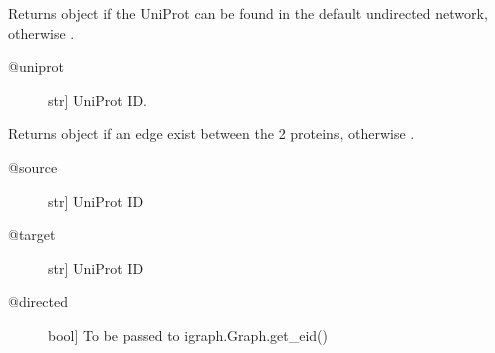 \documentclass[letterpaper,10pt,english]{sphinxmanual}
\begin{document}
\begin{fulllineitems}

\begin{fulllineitems}
\label{\detokenize{main:pypath.main.PyPath.up}}
Returns  object if the UniProt
can be found in the default undirected network,
otherwise .
\begin{description}
\item[{@uniprot}] \leavevmode{[}str{]}
UniProt ID.

\end{description}

\end{fulllineitems}


\begin{fulllineitems}
\label{\detokenize{main:pypath.main.PyPath.up_affected_by}}
\end{fulllineitems}


\begin{fulllineitems}
\label{\detokenize{main:pypath.main.PyPath.up_affects}}
\end{fulllineitems}


\begin{fulllineitems}
\label{\detokenize{main:pypath.main.PyPath.up_edge}}
Returns  object if an edge exist between
the 2 proteins, otherwise .
\begin{description}
\item[{@source}] \leavevmode{[}str{]}
UniProt ID

\item[{@target}] \leavevmode{[}str{]}
UniProt ID

\item[{@directed}] \leavevmode{[}bool{]}
To be passed to igraph.Graph.get\_eid()


\end{description}
\end{fulllineitems}
\end{fulllineitems}
\end{document}
